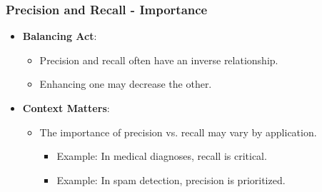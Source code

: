 \documentclass[aspectratio=169]{beamer}
\begin{document}
\begin{frame}[fragile]
    \frametitle{Precision and Recall - Importance}
    \begin{itemize}
        \item \textbf{Balancing Act}: 
        \begin{itemize}
            \item Precision and recall often have an inverse relationship.
            \item Enhancing one may decrease the other.
        \end{itemize}
        
        \item \textbf{Context Matters}:
        \begin{itemize}
            \item The importance of precision vs. recall may vary by application.
            \begin{itemize}
                \item Example: In medical diagnoses, recall is critical.
                \item Example: In spam detection, precision is prioritized.
            \end{itemize}
        \end{itemize}
    \end{itemize}
\end{frame}
\end{document}
